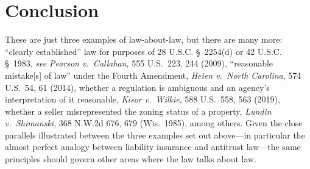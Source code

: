\documentclass[
  12pt,
  letterpaper,
]{scrartcl}
\begin{document}
\section{Conclusion}

These are just three examples of law-about-law, but there are many more:
``clearly established'' law for purposes of 28 U.S.C. § 2254(d) or 42 U.S.C.
§ 1983, \textit{see} \textit{Pearson v.~Callahan}, 555 U.S.~223, 244 (2009),
``reasonable mistake[s] of law'' under the Fourth Amendment, \textit{Heien
v.~North Carolina}, 574 U.S.~54, 61 (2014), whether a regulation is ambiguous and
an agency's interpretation of it reasonable, \textit{Kisor v.~Wilkie}, 588 U.S.~558, 563 (2019), whether a seller misrepresented the
zoning status of a property, \textit{Lundin v.~Shimanski}, 368
N.W.2d 676, 679 (Wis.~1985), among others. Given the close parallels
illustrated between the three examples set out above---in particular the almost
perfect analogy between liability insurance and antitrust law---the same principles should govern other areas where the law talks about
law.
\end{document}
